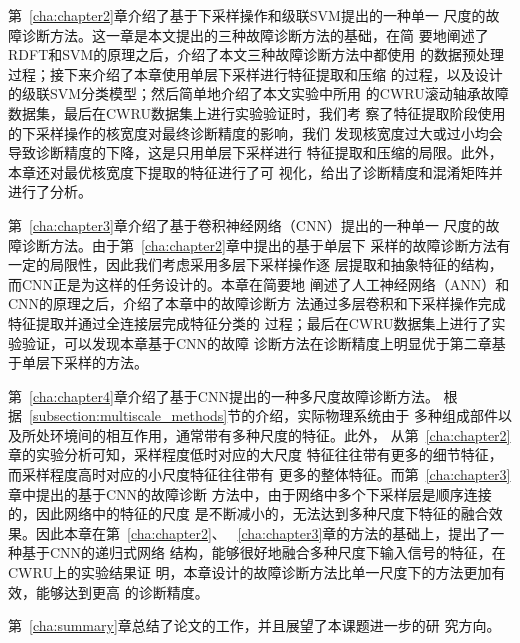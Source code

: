 第~\ref{cha:chapter2}章介绍了基于下采样操作和级联SVM提出的一种单一
尺度的故障诊断方法。这一章是本文提出的三种故障诊断方法的基础，在简
要地阐述了RDFT和SVM的原理之后，介绍了本文三种故障诊断方法中都使用
的数据预处理过程；接下来介绍了本章使用单层下采样进行特征提取和压缩
的过程，以及设计的级联SVM分类模型；然后简单地介绍了本文实验中所用
的CWRU滚动轴承故障数据集，最后在CWRU数据集上进行实验验证时，我们考
察了特征提取阶段使用的下采样操作的核宽度对最终诊断精度的影响，我们
发现核宽度过大或过小均会导致诊断精度的下降，这是只用单层下采样进行
特征提取和压缩的局限。此外，本章还对最优核宽度下提取的特征进行了可
视化，给出了诊断精度和混淆矩阵并进行了分析。

第~\ref{cha:chapter3}章介绍了基于卷积神经网络（CNN）提出的一种单一
尺度的故障诊断方法。由于第~\ref{cha:chapter2}章中提出的基于单层下
采样的故障诊断方法有一定的局限性，因此我们考虑采用多层下采样操作逐
层提取和抽象特征的结构，而CNN正是为这样的任务设计的。本章在简要地
阐述了人工神经网络（ANN）和CNN的原理之后，介绍了本章中的故障诊断方
法通过多层卷积和下采样操作完成特征提取并通过全连接层完成特征分类的
过程；最后在CWRU数据集上进行了实验验证，可以发现本章基于CNN的故障
诊断方法在诊断精度上明显优于第二章基于单层下采样的方法。

第~\ref{cha:chapter4}章介绍了基于CNN提出的一种多尺度故障诊断方法。
根据~\ref{subsection:multiscale_methods}节的介绍，实际物理系统由于
多种组成部件以及所处环境间的相互作用，通常带有多种尺度的特征。此外，
从第~\ref{cha:chapter2}章的实验分析可知，采样程度低时对应的大尺度
特征往往带有更多的细节特征，而采样程度高时对应的小尺度特征往往带有
更多的整体特征。而第~\ref{cha:chapter3}章中提出的基于CNN的故障诊断
方法中，由于网络中多个下采样层是顺序连接的，因此网络中的特征的尺度
是不断减小的，无法达到多种尺度下特征的融合效果。因此本章在第~\ref{cha:chapter2}、
~\ref{cha:chapter3}章的方法的基础上，提出了一种基于CNN的递归式网络
结构，能够很好地融合多种尺度下输入信号的特征，在CWRU上的实验结果证
明，本章设计的故障诊断方法比单一尺度下的方法更加有效，能够达到更高
的诊断精度。

第~\ref{cha:summary}章总结了论文的工作，并且展望了本课题进一步的研
究方向。
